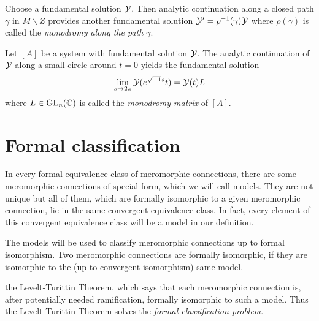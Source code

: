 Choose a fundamental solution $\mathcal{Y}$. Then analytic continuation along a closed
path $\gamma$ in $M\backslash Z$ provides another fundamental solution
$\mathcal{Y}'=\rho^{-1}(\gamma)\mathcal{Y}$ where $\rho(\gamma)$ is called the \emph{monodromy
along the path $\gamma$}.
\begin{defn}
  Let $[A]$ be a system with fundamental solution $\mathcal{Y}$.
  The analytic continuation of $\mathcal{Y}$ along a small circle around $t=0$ yields
  the fundamental solution
  \[
    \lim_{s\to2\pi}\mathcal{Y}(e^{\sqrt{-1}s}t)=\mathcal{Y}(t)L
  \]
  where $L\in\operatorname{GL}_n(\mathbb{C})$ is called the \emph{\TODO[(formal)?]monodromy matrix}
  of $[A]$.
\end{defn}

 

\section{Formal classification}\label{sec:formalClassification}
In every formal equivalence class of meromorphic connections, there are some
meromorphic connections of special form, which we will call models. They are
not unique but all of them, which are formally isomorphic to a given
meromorphic connection, lie in the same convergent equivalence class.
In fact, every element of this convergent equivalence class will be a model in
our definition.

The models will be used to classify meromorphic connections up to formal
isomorphism. Two meromorphic connections are formally isomorphic, if they are
isomorphic to the (up to convergent isomorphism) same model.

\PROBLEM[rewrite]
 the Levelt-Turittin Theorem, which says
that each meromorphic connection is, after potentially needed ramification,
formally isomorphic to such a model.
Thus the Levelt-Turittin Theorem solves the \emph{formal classification
problem}.

